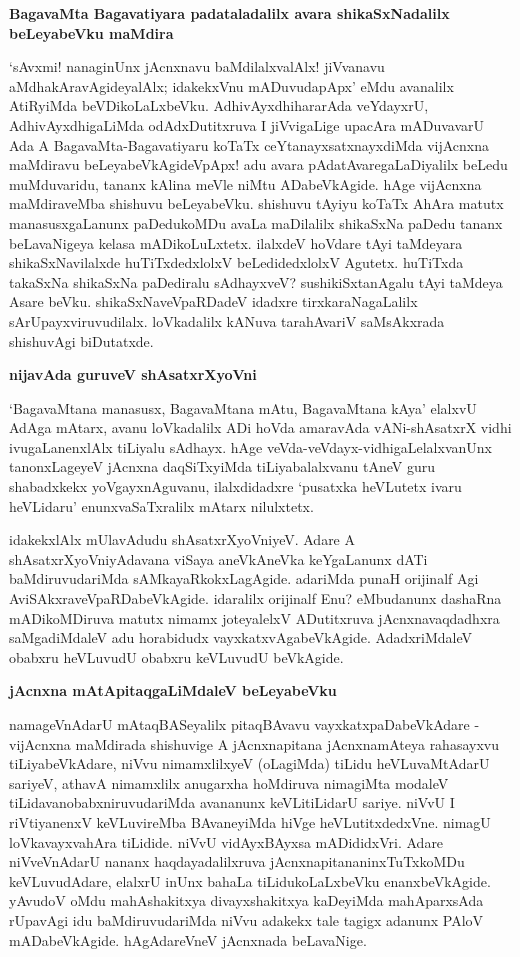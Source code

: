 \noindent
\textbf{BagavaMta Bagavatiyara padataladalilx avara shikaSxNadalilx beLeyabeVku maMdira}\label{page67}

`sAvxmi! nanaginUnx jAcnxnavu baMdilalxvalAlx! jiVvanavu aMdhakAravAgideyalAlx; idakekxVnu mADuvudapApx' eMdu avanalilx AtiRyiMda beVDikoLaLxbeVku. AdhivAyxdhihararAda veYdayxrU, AdhivAyxdhigaLiMda odAdxDutitxruva I jiVvigaLige upacAra mADuvavarU Ada A BagavaMta-Bagavatiyaru koTaTx ceYtanayxsatxnayxdiMda vijAcnxna maMdiravu beLeyabeVkAgideVpApx! adu avara pAdatAvaregaLaDiyalilx beLedu muMduvaridu, tananx kAlina meVle niMtu ADabeVkAgide. hAge vijAcnxna maMdiraveMba shishuvu beLeyabeVku. shishuvu tAyiyu koTaTx AhAra matutx manasusxgaLanunx paDedukoMDu avaLa maDilalilx shikaSxNa paDedu tananx beLavaNigeya kelasa mADikoLuLxtetx. ilalxdeV hoVdare tAyi taMdeyara shikaSxNavilalxde huTiTxdedxlolxV beLedidedxlolxV Agutetx. huTiTxda takaSxNa shikaSxNa paDediralu sAdhayxveV? sushikiSxtanAgalu tAyi taMdeya Asare beVku. shikaSxNaveVpaRDadeV idadxre tirxkaraNagaLalilx sArUpayxviruvudilalx. loVkadalilx kANuva tarahAvariV saMsAkxrada shishuvAgi biDutatxde.

\noindent
\textbf{nijavAda guruveV shAsatxrXyoVni}\label{page68}

`BagavaMtana manasusx, BagavaMtana mAtu, BagavaMtana kAya' elalxvU AdAga mAtarx, avanu loVkadalilx ADi hoVda amaravAda vANi-shAsatxrX vidhi ivugaLanenxlAlx tiLiyalu sAdhayx. hAge veVda-veVdayx-vidhigaLelalxvanUnx tanonxLageyeV jAcnxna daqSiTxyiMda tiLiyabalalxvanu tAneV guru shabadxkekx yoVgayxnAguvanu, ilalxdidadxre `pusatxka heVLutetx ivaru heVLidaru' enunxvaSaTxralilx mAtarx nilulxtetx.

idakekxlAlx mUlavAdudu shAsatxrXyoVniyeV. Adare A shAsatxrXyoVniyAdavana viSaya aneVkAneVka keYgaLanunx dATi baMdiruvudariMda sAMkayaRkokxLagAgide. adariMda punaH orijinalf Agi AviSAkxraveVpaRDabeVkAgide. idaralilx orijinalf Enu? eMbudanunx dashaRna mADikoMDiruva matutx nimamx joteyalelxV ADutitxruva jAcnxnavaqdadhxra saMgadiMdaleV adu horabidudx vayxkatxvAgabeVkAgide. AdadxriMdaleV obabxru heVLuvudU obabxru keVLuvudU beVkAgide.

\noindent
\textbf{jAcnxna mAtApitaqgaLiMdaleV beLeyabeVku}\label{page79}

namageVnAdarU mAtaqBASeyalilx pitaqBAvavu vayxkatxpaDabeVkAdare - vijAcnxna maMdirada shishuvige A jAcnxnapitana jAcnxnamAteya rahasayxvu tiLiyabeVkAdare, niVvu nimamxlilxyeV (oLagiMda) tiLidu heVLuvaMtAdarU sariyeV, athavA nimamxlilx anugarxha hoMdiruva nimagiMta modaleV tiLidavanobabxniruvudariMda avananunx keVLitiLidarU sariye. niVvU I riVtiyanenxV keVLuvireMba BAvaneyiMda hiVge heVLutitxdedxVne. nimagU loVkavayxvahAra tiLidide. niVvU vidAyxBAyxsa mADididxVri. Adare niVveVnAdarU nananx haqdayadalilxruva jAcnxnapitananinxTuTxkoMDu keVLuvudAdare, elalxrU inUnx bahaLa tiLidukoLaLxbeVku enanxbeVkAgide. yAvudoV oMdu mahAshakitxya divayxshakitxya kaDeyiMda mahAparxsAda rUpavAgi idu baMdiruvudariMda niVvu adakekx tale tagigx adanunx PAloV mADabeVkAgide. hAgAdareVneV jAcnxnada beLavaNige.

